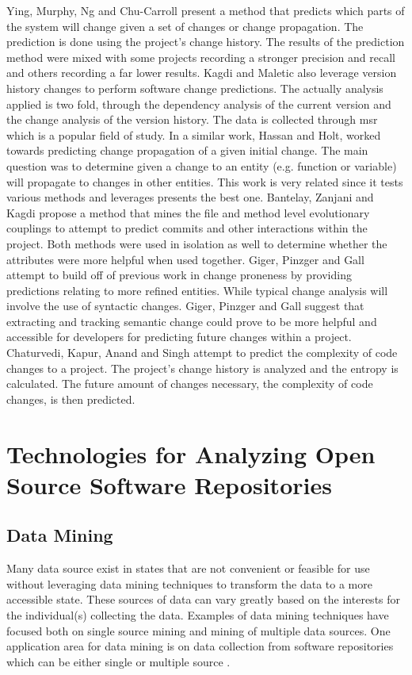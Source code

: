 Ying, Murphy, Ng and Chu-Carroll present a method that predicts which parts of the system will change given a set of changes or change propagation\cite{Ying2004}. The prediction is done using the project's change history. The results of the prediction method were mixed with some projects recording a stronger precision and recall and others recording a far lower results. Kagdi and Maletic also leverage version history changes to perform software change predictions. The actually analysis applied is two fold, through the dependency analysis of the current version and the change analysis of the version history. The data is collected through \gls{msr} which is a popular field of study. In a similar work, Hassan and Holt, worked towards predicting change propagation of a given initial change. The main question was to determine given a change to an entity (e.g. function or variable) will propagate to changes in other entities. This work is very related since it tests various methods and leverages presents the best one. Bantelay, Zanjani and Kagdi propose a method that mines the file and method level evolutionary couplings to attempt to predict commits and other interactions within the project\cite{Bantelay2013}. Both methods were used in isolation as well to determine whether the attributes were more helpful when used together. Giger, Pinzger and Gall attempt to build off of previous work in change proneness by providing predictions relating to more refined entities\cite{Giger2012}. While typical change analysis will involve the use of syntactic changes. Giger, Pinzger and Gall suggest that extracting and tracking semantic change could prove to be more helpful and accessible for developers for predicting future changes within a project\cite{Giger2012}. Chaturvedi, Kapur, Anand and Singh attempt to predict the complexity of code changes to a project\cite{Chaturvedi2014}. The project's change history is analyzed and the entropy is calculated. The future amount of changes necessary, the complexity of code changes, is then predicted.

\section{Technologies for Analyzing Open Source Software Repositories}

\subsection{Data Mining}

Many data source exist in states that are not convenient or feasible for use without leveraging data mining techniques to transform the data to a more accessible state. These sources of data can vary greatly based on the interests for the individual(s) collecting the data. Examples of data mining techniques have focused both on single source mining and mining of multiple data sources. One application area for data mining is on data collection from software repositories which can be either single or multiple source \cite{Dit2013, Hassan2006, Hemmati2013, Kagdi2007, Maletic2004, Zimmermann2005a}.%

